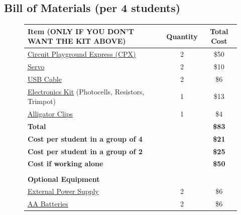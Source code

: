 \subsection{Bill of Materials (per 4 students)}

\begin{figure}[H]
  \begin{center}
    \begin{tabular}{|l|c|c|}
      \hline
      Item (ONLY IF YOU DON’T WANT THE KIT ABOVE) & Quantity & Total
      Cost \\
      \hline
      \href{https://www.adafruit.com/product/3333}{Circuit Playground Express (CPX)} & 2 & \$50 \\
      \hline
      \href{https://www.adafruit.com/product/169}{Servo} & 2 & \$10 \\
      \hline
      \href{https://www.adafruit.com/product/592}{USB Cable} & 2 & \$6 \\
      \hline
      \href{https://www.amazon.com/Smraza-Breadboard-Resistors-Mega2560-Raspberry/dp/B01HRR7EBG/ref=sr_1_3?dchild=1&keywords=photocell+circuit+kit&qid=1590531716&sr=8-3}{Electronics Kit} (Photocells, Resistors, Trimpot) & 1 & \$13 \\
      \hline
      \href{https://www.amazon.com/WGGE-WG-026-Pieces-Colors-Alligator/dp/B06XX25HFX/ref=sr_1_1_sspa?dchild=1&keywords=alligator+clips&qid=1613147431&sr=8-1-spons&psc=1&spLa=ZW5jcnlwdGVkUXVhbGlmaWVyPUFLRjlYRVM3SDIySVAmZW5jcnlwdGVkSWQ9QTAwNDczMzEyODNCVTJWSjlMR0NEJmVuY3J5cHRlZEFkSWQ9QTAwMDQyMjkzSlJLNjJRWk9CSVZEJndpZGdldE5hbWU9c3BfYXRmJmFjdGlvbj1jbGlja1JlZGlyZWN0JmRvTm90TG9nQ2xpY2s9dHJ1ZQ==}{Alligator Clips} & 1 & \$4 \\
      \hline
      {\bf Total} & & {\bf \$83} \\
      \hline
      {\bf Cost per student in a group of 4} & & {\bf \$21} \\
      \hline
      {\bf Cost per student in a group of 2} & & {\bf \$25} \\
      \hline
      {\bf Cost if working alone} & & {\bf \$50} \\
      \hline
       & & \\
      \hline
      {\bf Optional Equipment} & & \\
      \hline
      \href{https://www.adafruit.com/product/3287}{External Power Supply} & 2 & \$6 \\
      \hline
      \href{https://www.adafruit.com/product/3349}{AA Batteries} & 2 & \$6 \\
      \hline

\end{tabular}
\end{center}
\end{figure}
